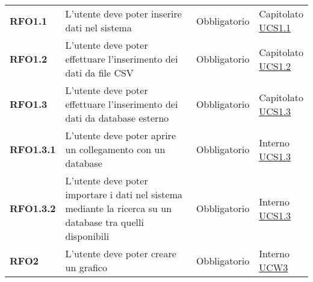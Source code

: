 \begin{longtable}[H]{| >{\raggedright\bfseries}m{20mm} | >{\raggedright}m{90mm} | >{\centering}m{25mm} | >{\centering\arraybackslash}m{30mm}|}
    RFO1.1
     & L'utente deve poter inserire dati nel sistema
     & Obbligatorio
     & \makecell{
    Capitolato                                                                                                           \\
    \hyperref[ssub:ucs1.1]{UCS1.1}}                                                                                      \\

    RFO1.2
     & L'utente deve poter effettuare l'inserimento dei dati da file CSV
     & Obbligatorio
     & \makecell{
    Capitolato                                                                                                           \\
    \hyperref[ssub:ucs1.2]{UCS1.2}}                                                                                      \\

    RFO1.3
     & L'utente deve poter effettuare l'inserimento dei dati da database esterno
     & Obbligatorio
     & \makecell{
    Capitolato                                                                                                           \\
    \hyperref[ssub:ucs1.3]{UCS1.3}}                                                                                      \\

    RFO1.3.1
     & L'utente deve poter aprire un collegamento con un database
     & Obbligatorio
     & \makecell{ Interno                                                                                                \\  \hyperref[ssub:ucs1.3]{UCS1.3}}\\

    RFO1.3.2
     & L'utente deve poter importare i dati nel sistema mediante la ricerca
    su un database tra quelli disponibili
     & Obbligatorio
     & \makecell{ Interno                                                                                                \\ \hyperref[ssub:ucs1.3]{UCS1.3}}\\

    RFO2
     & L'utente deve poter creare un grafico
     & Obbligatorio
     & \makecell{ Interno                                                                                                \\ \hyperref[sub:ucw3]{UCW3}}\\


\end{longtable}
